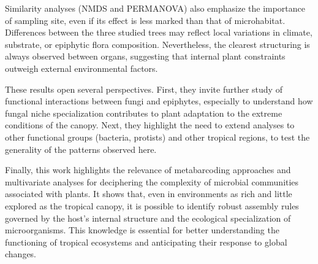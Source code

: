 \documentclass[alpha-refs,twocolumn]{wiley-article}
\begin{document}
Similarity analyses (NMDS and PERMANOVA) also emphasize the importance of sampling site, even if its effect is less marked than that of microhabitat. Differences between the three studied trees may reflect local variations in climate, substrate, or epiphytic flora composition. Nevertheless, the clearest structuring is always observed between organs, suggesting that internal plant constraints outweigh external environmental factors.

These results open several perspectives. First, they invite further study of functional interactions between fungi and epiphytes, especially to understand how fungal niche specialization contributes to plant adaptation to the extreme conditions of the canopy. Next, they highlight the need to extend analyses to other functional groups (bacteria, protists) and other tropical regions, to test the generality of the patterns observed here.

Finally, this work highlights the relevance of metabarcoding approaches and multivariate analyses for deciphering the complexity of microbial communities associated with plants. It shows that, even in environments as rich and little explored as the tropical canopy, it is possible to identify robust assembly rules governed by the host's internal structure and the ecological specialization of microorganisms. This knowledge is essential for better understanding the functioning of tropical ecosystems and anticipating their response to global changes.


\end{document}
